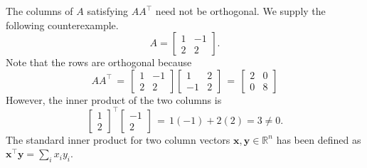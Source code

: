 \documentclass[10pt]{article}
\def\x{\bm{x}}
\def\y{\bm{y}}
\begin{document}
        The columns of $A$ satisfying $A A^\top$ need not be orthogonal. We supply the following counterexample.
        \[
                A = \begin{bmatrix}
                        1 & -1 \\ 2 & 2
                \end{bmatrix}.
        \]
        Note that the rows are orthogonal because 
        \[
                A A^\top \,=\, \begin{bmatrix}
                        1 & -1 \\ 2 & 2
                \end{bmatrix}
                \begin{bmatrix}
                        1 & 2 \\ -1 & 2
                \end{bmatrix}
                \,=\, \begin{bmatrix}
                        2 & 0 \\ 0 & 8
                \end{bmatrix}
        \]
        However, the inner product of the two columns is
        \[
                \begin{bmatrix}
                        1 \\ 2
                \end{bmatrix}^\top
                \begin{bmatrix}
                        -1 \\ 2
                \end{bmatrix}
                \,=\, 1(-1) + 2(2) = 3 \neq 0.
        \]
        The standard inner product for two column vectors $\x, \y \in \mathbb{R}^n$ has been defined as $\x^\top\y = \sum_i x_iy_i$.
\end{document}
